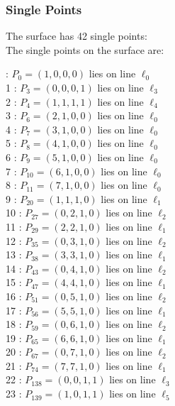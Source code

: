 \documentclass{article}
\begin{document}
{\subsubsection*{Single Points}
The surface has 42 single points:\\
The single points on the surface are:\\
\begin{multicols}{2}
 : $P_{0}=( 1, 0, 0, 0 )$ lies on line $\ell_{0}$\\
1 : $P_{3}=( 0, 0, 0, 1 )$ lies on line $\ell_{3}$\\
2 : $P_{4}=( 1, 1, 1, 1 )$ lies on line $\ell_{4}$\\
3 : $P_{6}=( 2, 1, 0, 0 )$ lies on line $\ell_{0}$\\
4 : $P_{7}=( 3, 1, 0, 0 )$ lies on line $\ell_{0}$\\
5 : $P_{8}=( 4, 1, 0, 0 )$ lies on line $\ell_{0}$\\
6 : $P_{9}=( 5, 1, 0, 0 )$ lies on line $\ell_{0}$\\
7 : $P_{10}=( 6, 1, 0, 0 )$ lies on line $\ell_{0}$\\
8 : $P_{11}=( 7, 1, 0, 0 )$ lies on line $\ell_{0}$\\
9 : $P_{20}=( 1, 1, 1, 0 )$ lies on line $\ell_{1}$\\
10 : $P_{27}=( 0, 2, 1, 0 )$ lies on line $\ell_{2}$\\
11 : $P_{29}=( 2, 2, 1, 0 )$ lies on line $\ell_{1}$\\
12 : $P_{35}=( 0, 3, 1, 0 )$ lies on line $\ell_{2}$\\
13 : $P_{38}=( 3, 3, 1, 0 )$ lies on line $\ell_{1}$\\
14 : $P_{43}=( 0, 4, 1, 0 )$ lies on line $\ell_{2}$\\
15 : $P_{47}=( 4, 4, 1, 0 )$ lies on line $\ell_{1}$\\
16 : $P_{51}=( 0, 5, 1, 0 )$ lies on line $\ell_{2}$\\
17 : $P_{56}=( 5, 5, 1, 0 )$ lies on line $\ell_{1}$\\
18 : $P_{59}=( 0, 6, 1, 0 )$ lies on line $\ell_{2}$\\
19 : $P_{65}=( 6, 6, 1, 0 )$ lies on line $\ell_{1}$\\
20 : $P_{67}=( 0, 7, 1, 0 )$ lies on line $\ell_{2}$\\
21 : $P_{74}=( 7, 7, 1, 0 )$ lies on line $\ell_{1}$\\
22 : $P_{138}=( 0, 0, 1, 1 )$ lies on line $\ell_{3}$\\
23 : $P_{139}=( 1, 0, 1, 1 )$ lies on line $\ell_{5}$\\

\end{multicols}}
\end{document}

